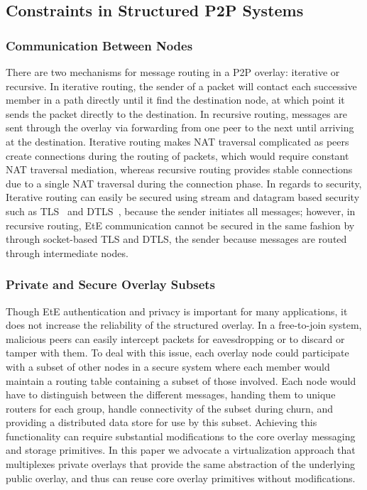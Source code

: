 \documentclass[conference]{IEEEtran}
\begin{document}
\subsection{Constraints in Structured P2P Systems}
\subsubsection{Communication Between Nodes}
There are two mechanisms for message routing in a P2P overlay: iterative or
recursive.  In iterative routing, the sender of a packet will contact each
successive member in a path directly until it find the destination node, at
which point it sends the packet directly to the destination.  In recursive
routing, messages are sent through the overlay via forwarding from one peer to
the next until arriving at the destination.  Iterative routing makes NAT
traversal complicated as peers create connections during the routing of packets,
which would require constant NAT traversal mediation, whereas recursive routing
provides stable connections due to a single NAT traversal during the connection
phase.  In regards to security, Iterative routing can easily be secured using
stream and datagram based security such as TLS~\cite{tls} and DTLS~\cite{dtls},
because the sender initiates all messages; however, in
recursive routing, EtE communication cannot be secured in the same fashion by
through socket-based TLS and DTLS, the sender because messages are routed
through intermediate nodes.

\subsubsection{Private and Secure Overlay Subsets}
Though EtE authentication and privacy is important for many applications, it
does not increase the reliability of the structured
overlay.  In a free-to-join system, malicious peers can easily intercept packets
for eavesdropping or to discard or tamper with them.  To deal with
this issue, each overlay node could participate with a subset of other nodes in
a secure system where each member would maintain a routing table containing a subset
of those involved.  Each node would have to distinguish between the different
messages, handing them to unique routers for each group, handle connectivity
of the subset during churn, and providing a distributed data store for use by this subset.
Achieving this functionality can require substantial modifications to the core overlay
messaging and storage primitives. In this paper we advocate a virtualization approach
that multiplexes private overlays that provide the same abstraction of the underlying
public overlay, and thus can reuse core overlay primitives without modifications.
\end{document}
